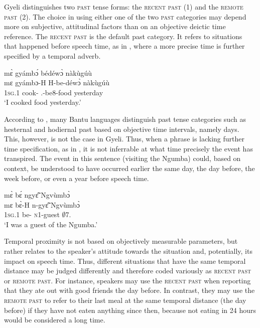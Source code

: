 Gyeli distinguishes two \textsc{past} tense forms: the \textsc{recent past} ({\PST}1) and the \textsc{remote past} ({\PST}2).  The choice in using either one of the two \textsc{past} categories may depend more on subjective, attitudinal factors than on an objective deictic time reference. The \textsc{recent past} is the default past category.
It refers to situations that happened before speech time, as in , where a more precise time is further specified by a temporal adverb.

\ea\label{pst1a}
  \glll  mɛ̀ gyámbɔ́ bédéwɔ̀ nàkùgúù \\
         mɛ gyámbɔ-H H-be-déwɔ̀ nàkùgúù\\
            1\textsc{sg}.{\PST}1 cook-{\R} {\OBJ}.{\LINK}-be8-food yesterday\\
    \trans `I cooked food yesterday.'
\z

According to \citet[22]{nurse08}, many Bantu languages distinguish past tense categories  such as hesternal and hodiernal past based on objective time intervals, namely days.  This, however, is not the case in Gyeli. Thus, when a phrase is lacking further time specification, as in , it is not inferrable at what time precisely the event has transpired. The event in this sentence (visiting the Ngumba) could, based on context, be understood to have occurred earlier the same day, the day before, the week before, or even a year before speech time.

\ea\label{pst1b}
  \glll   mɛ̀ bɛ́ ngyɛ̃̂ Ngvùmbɔ̀ \\
          mɛ bɛ̀-H n-gyɛ̃̂ Ngvùmbɔ̀ \\
           1\textsc{sg}.{\PST}1 be-{\R} \textsc{n}1-guest $\emptyset$7.{\PN}  \\
    \trans `I was a guest of the Ngumba.'
\z

Temporal proximity is not based on objectively measurable parameters, but rather relates to the speaker's attitude towards the situation and, potentially, its impact on speech time. Thus, different situations that have the same temporal distance may be judged differently and therefore coded variously as \textsc{recent past} or \textsc{remote past}. For instance, speakers may use the \textsc{recent past} when reporting that they ate out with good friends the day before. In contrast, they may use the \textsc{remote past} to refer to their last meal at the same temporal distance (the day before) if they have not eaten anything since then, because not eating in 24 hours would be considered a long time.

